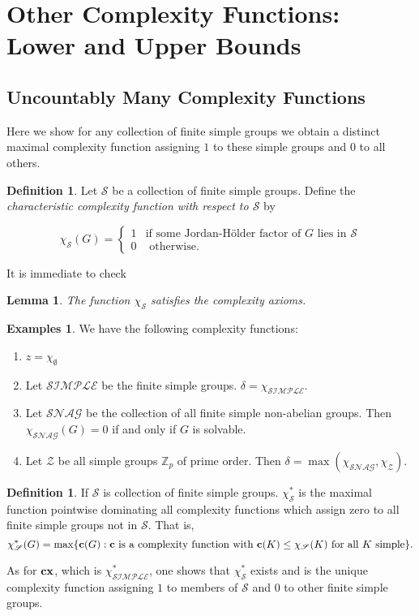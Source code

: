 \documentclass[a4paper,11pt]{amsart}
\newtheorem{lemma}[theorem]{Lemma}
\theoremstyle{definition}
\newtheorem{definition}[theorem]{Definition}
\newtheorem{examples}{Examples}
\newcommand{\cx}{\mbox{\bf cx}}
\renewcommand{\c}{\mbox{\bf c}}
\newcommand{\Z}{\mathbb{Z}}
\newcommand{\1}{{\mathbf 1}}
\renewcommand{\S}{{\mathscr{S}}}
\newcommand{\SNAG}{{\mathscr{SNAG}}}
\newcommand{\SIMPLE}{{\mathscr{SIMPLE}}}
\begin{document}
\section{Other Complexity Functions: Lower and Upper Bounds}

\subsection{Uncountably Many Complexity Functions} 
Here we show for any collection of finite simple groups we obtain a distinct maximal  complexity function
assigning $1$ to these simple groups and $0$ to all others. 



\begin{definition}
Let $\S$ be a collection of finite simple groups.   Define the {\em characteristic complexity function with respect to $\S$} by 

   $$\chi_{\S}(G)
   = \begin{cases}
      1 & \mbox{if some Jordan-H\"{o}lder factor of $G$ lies in } {\S} \\
      0      & \mbox{ otherwise.}
    \end{cases}$$



\end{definition}


It is immediate to check 
\begin{lemma} 
The  function  $\chi_{\S}$ satisfies the complexity axioms.
\end{lemma}


\begin{examples} We have the following complexity functions:
\begin{enumerate} 
\item 
 $z=\chi_{\emptyset}$
\item Let $\SIMPLE$ be the finite simple groups. $\delta=\chi_{\SIMPLE}$. 
\item 
Let ${\SNAG}$ be the collection of all finite simple non-abelian groups. 
Then $\chi_{\SNAG}(G)=0$ if and only if $G$ is solvable.
\item Let ${\mathscr Z}$ be all simple groups $\Z_p$ of prime order.  Then
  $\delta=\max(\chi_{\SNAG},\chi_{\mathscr Z}).$
  \end{enumerate}
\end{examples} 



\begin{definition}
If $\S$ is collection of finite simple groups. 
$\chi_{\S}^*$ is the maximal function pointwise dominating all complexity functions which
assign zero to all finite simple groups not in $\S$. That is, 
$$\chi_{\S}^*(G)=
\max\{\c(G): \c \mbox{ is a complexity function  with  $\c(K)\leq \chi_{\S}(K)$  for all $K$ simple}\}.$$
   
\end{definition}
As for $\cx$, which is $\chi^*_{\SIMPLE}$, one shows that $\chi_{\S}^*$ exists and is the unique
complexity function assigning $1$ to members of $\S$ and $0$ to other finite simple groups.
\end{document}
